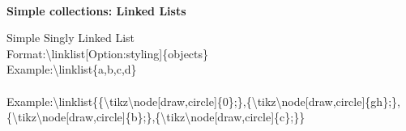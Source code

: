 \documentclass{article}
\begin{document}
\begin{adjustbox}{width=0.5\paperwidth,center,keepaspectratio}
\end{adjustbox}\\
\newpage
\begin{center}
\textbf{{\Large Simple collections: Linked Lists}}
\end{center}
Simple Singly Linked List\\
Format:{\textbackslash}linklist[Option:styling]{\{}objects{\}}\\
Example:{\textbackslash}linklist{\{}a,b,c,d{\}} \newline \\
\begin{adjustbox}{width=0.5\paperwidth,center,keepaspectratio}
\end{adjustbox}\\

Example:{\textbackslash}linklist{\{}{\{}{\textbackslash}tikz{\textbackslash}node[draw,circle]{\{}0{\}};{\}},{\{}{\textbackslash}tikz{\textbackslash}node[draw,circle]{\{}gh{\}};{\}},{\{}{\textbackslash}tikz{\textbackslash}node[draw,circle]{\{}b{\}};{\}},{\{}{\textbackslash}tikz{\textbackslash}node[draw,circle]{\{}c{\}};{\}}{\}}\\
\begin{adjustbox}{width=0.5\paperwidth,center,keepaspectratio}
\end{adjustbox}\\
\end{document}
